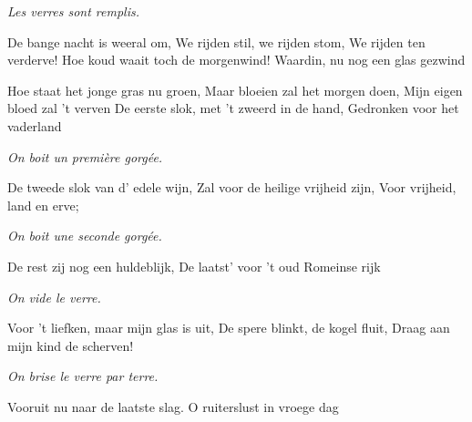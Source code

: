 \footnotemark [
tu={Tübinger Burschenschaft (P. : G. Herwegh, 1835 - M. : J. W. Lyra, 1843)},
ititle={Ruiterslied}]


\emph{Les verres sont remplis.}

\beginverse
De bange nacht is weeral om,
We rijden stil, we rijden stom,
We rijden ten verderve!
Hoe koud waait toch de morgenwind!
Waardin, nu nog een glas gezwind
\endverse

\beginverse
Hoe staat het jonge gras nu groen,
Maar bloeien zal het morgen doen,
Mijn eigen bloed zal 't verven
De eerste slok, met 't zweerd in de hand,
Gedronken voor het vaderland
\endverse

\emph{On boit un première gorgée.}

\beginverse
De tweede slok van d' edele wijn,
Zal voor de heilige vrijheid zijn,
Voor vrijheid, land en erve;
\endverse

\emph{On boit une seconde gorgée.}

\beginverse
De rest zij nog een huldeblijk,
De laatst' voor 't oud Romeinse rijk
\endverse

\emph{On vide le verre.}

\beginverse
Voor 't liefken, maar mijn glas is uit,
De spere blinkt, de kogel fluit,
Draag aan mijn kind de scherven!
\endverse

\emph{On brise le verre par terre.}

\beginverse
Vooruit nu naar de laatste slag.
O ruiterslust in vroege dag
\endverse
\endsong
